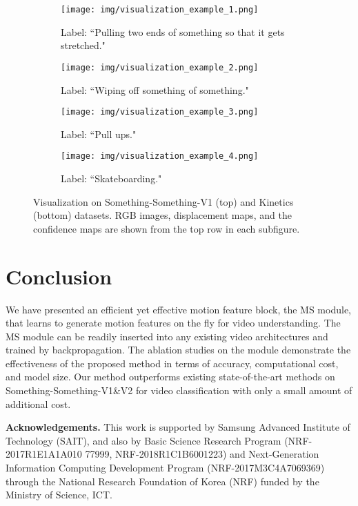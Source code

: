 \documentclass[runningheads]{llncs}
\begin{document}
\begin{figure}[t]
    \centering
    \begin{subfigure}[]{0.495\columnwidth}
    \texttt{[image: img/visualization\_example\_1.png]}
    \caption{Label: ``Pulling two ends of something so that it gets stretched."}
    \label{fig:6a}
    \end{subfigure}
    \begin{subfigure}[]{0.495\columnwidth}
    \texttt{[image: img/visualization\_example\_2.png]}
    \caption{Label:    ``Wiping off something of something."}
    \label{fig:6b}
    \end{subfigure}
    \begin{subfigure}[]{0.495\columnwidth}
    \texttt{[image: img/visualization\_example\_3.png]}
    \caption{Label: ``Pull ups."}
    \label{fig:6c}
    \end{subfigure}
    \begin{subfigure}[]{0.495\columnwidth}
    \texttt{[image: img/visualization\_example\_4.png]}
    \caption{Label: ``Skateboarding."}
    \label{fig:6d}
    \end{subfigure}
\caption{Visualization on Something-Something-V1 (top) and Kinetics (bottom) datasets. RGB images, displacement maps, and the confidence maps are shown from the top row in each subfigure.} \label{fig:6}
\end{figure}
 



\section{Conclusion}
We have presented an efficient yet effective motion feature block, the MS module, that learns to generate motion features on the fly for video understanding. The MS module can be readily inserted into any existing video architectures and trained by backpropagation.
The ablation studies on the module demonstrate the effectiveness of the proposed method in terms of accuracy, computational cost, and model size.
Our method outperforms existing state-of-the-art methods on Something-Something-V1\&V2 for video classification with only a small amount of additional cost.

 
\bigskip
\noindent \textbf{Acknowledgements.}
This work is supported by Samsung Advanced Institute of Technology (SAIT), and also by Basic Science Research Program (NRF-2017R1E1A1A010 77999, NRF-2018R1C1B6001223) and Next-Generation Information Computing Development Program (NRF-2017M3C4A7069369) through the National Research Foundation of Korea (NRF) funded by the Ministry of Science, ICT.
\end{document}
